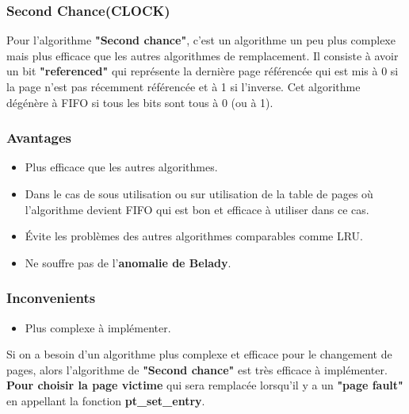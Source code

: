 \documentclass{article}
\begin{document}
\subsubsection{Second Chance(CLOCK)}
Pour l’algorithme \textbf{"Second chance"}, c'est un algorithme un peu plus complexe mais plus efficace que les autres algorithmes de remplacement. Il consiste à avoir un bit \textbf{"referenced"} qui représente la dernière page référencée qui est mis à 0 si la page n'est pas récemment référencée et à 1 si l'inverse.\newline
Cet algorithme dégénère à FIFO si tous les bits sont tous à 0 (ou à 1).
 
\subsubsection*{Avantages}
\begin{itemize}
\item Plus efficace que les autres algorithmes.
\item Dans le cas de sous utilisation ou sur utilisation de la table de pages où l'algorithme devient FIFO qui est bon et efficace à utiliser dans ce cas.
\item Évite les problèmes des autres algorithmes comparables comme LRU.
\item Ne souffre pas de l'\textbf{anomalie de Belady}.
\end{itemize}

\subsubsection*{Inconvenients}
\begin{itemize}
\item Plus complexe à implémenter. 
\end{itemize}
Si on a besoin d'un algorithme plus complexe et efficace pour le changement de pages, alors l'algorithme de \textbf{"Second chance"} est très efficace à implémenter.\newline
 \textbf{Pour choisir la page victime} qui sera remplacée lorsqu'il y a un \textbf{"page fault"} en appellant la fonction \textbf{pt\_set\_entry}.
\end{document}
